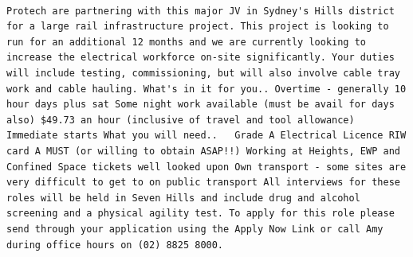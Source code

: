 \documentclass[11pt,a4paper,]{article}
\begin{document}
\begin{verbatim}
                                                                                                                                                                                                                                                                                                                                                    Protech are partnering with this major JV in Sydney's Hills district for a large rail infrastructure project. This project is looking to run for an additional 12 months and we are currently looking to increase the electrical workforce on-site significantly. Your duties will include testing, commissioning, but will also involve cable tray work and cable hauling. What's in it for you.. Overtime - generally 10 hour days plus sat Some night work available (must be avail for days also) $49.73 an hour (inclusive of travel and tool allowance) Immediate starts What you will need..   Grade A Electrical Licence RIW card A MUST (or willing to obtain ASAP!!) Working at Heights, EWP and Confined Space tickets well looked upon Own transport - some sites are very difficult to get to on public transport All interviews for these roles will be held in Seven Hills and include drug and alcohol screening and a physical agility test. To apply for this role please send through your application using the Apply Now Link or call Amy during office hours on (02) 8825 8000.      

\end{verbatim}
\end{document}
